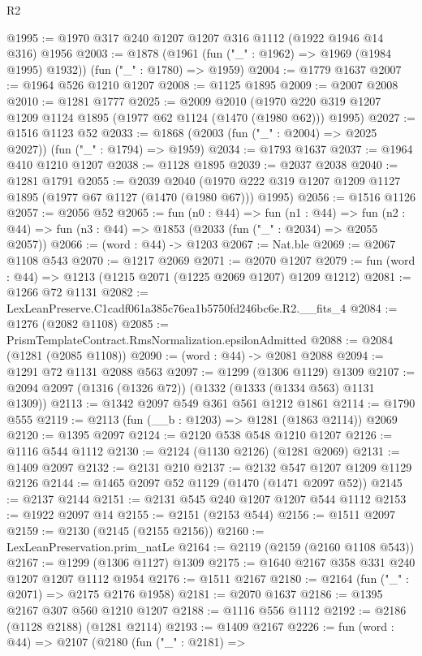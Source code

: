 \begin{lexlean}{R2}
\begin{coremodule}
@1995 := @1970 @317 @240 @1207 @1207 @316 @1112 (@1922 @1946 @14 @316) @1956
@2003 := @1878 (@1961 (fun ("_" : @1962) => @1969 (@1984 @1995) @1932)) (fun ("_" : @1780) => @1959)
@2004 := @1779 @1637
@2007 := @1964 @526 @1210 @1207
@2008 := @1125 @1895
@2009 := @2007 @2008
@2010 := @1281 @1777
@2025 := @2009
    @2010
    (@1970 @220 @319 @1207 @1209 @1124 @1895 (@1977 @62 @1124 (@1470 (@1980 @62))) @1995)
@2027 := @1516 @1123 @52
@2033 := @1868 (@2003 (fun ("_" : @2004) => @2025 @2027)) (fun ("_" : @1794) => @1959)
@2034 := @1793 @1637
@2037 := @1964 @410 @1210 @1207
@2038 := @1128 @1895
@2039 := @2037 @2038
@2040 := @1281 @1791
@2055 := @2039
    @2040
    (@1970 @222 @319 @1207 @1209 @1127 @1895 (@1977 @67 @1127 (@1470 (@1980 @67))) @1995)
@2056 := @1516 @1126
@2057 := @2056 @52
@2065 := fun (n0 : @44) =>
  fun (n1 : @44) =>
  fun (n2 : @44) => fun (n3 : @44) => @1853 (@2033 (fun ("_" : @2034) => @2055 @2057))
@2066 := (word : @44) -> @1203
@2067 := Nat.ble
@2069 := @2067 @1108 @543
@2070 := @1217 @2069
@2071 := @2070 @1207
@2079 := fun (word : @44) => @1213 (@1215 @2071 (@1225 @2069 @1207) @1209 @1212)
@2081 := @1266 @72 @1131
@2082 := LexLeanPreserve.C1cadf061a385c76ea1b5750fd246bc6e.R2.__fits_4
@2084 := @1276 (@2082 @1108)
@2085 := PrismTemplateContract.RmsNormalization.epsilonAdmitted
@2088 := @2084 (@1281 (@2085 @1108))
@2090 := (word : @44) -> @2081 @2088
@2094 := @1291 @72 @1131 @2088 @563
@2097 := @1299 (@1306 @1129) @1309
@2107 := @2094 @2097 (@1316 (@1326 @72)) (@1332 (@1333 (@1334 @563) @1131 @1309))
@2113 := @1342 @2097 @549 @361 @561 @1212 @1861
@2114 := @1790 @555
@2119 := @2113 (fun (__b : @1203) => @1281 (@1863 @2114)) @2069
@2120 := @1395 @2097
@2124 := @2120 @538 @548 @1210 @1207
@2126 := @1116 @544 @1112
@2130 := @2124 (@1130 @2126) (@1281 @2069)
@2131 := @1409 @2097
@2132 := @2131 @210
@2137 := @2132 @547 @1207 @1209 @1129 @2126
@2144 := @1465 @2097 @52 @1129 (@1470 (@1471 @2097 @52))
@2145 := @2137 @2144
@2151 := @2131 @545 @240 @1207 @1207 @544 @1112
@2153 := @1922 @2097 @14
@2155 := @2151 (@2153 @544)
@2156 := @1511 @2097
@2159 := @2130 (@2145 (@2155 @2156))
@2160 := LexLeanPreservation.prim_natLe
@2164 := @2119 (@2159 (@2160 @1108 @543))
@2167 := @1299 (@1306 @1127) @1309
@2175 := @1640 @2167 @358 @331 @240 @1207 @1207 @1112 @1954
@2176 := @1511 @2167
@2180 := @2164 (fun ("_" : @2071) => @2175 @2176 @1958)
@2181 := @2070 @1637
@2186 := @1395 @2167 @307 @560 @1210 @1207
@2188 := @1116 @556 @1112
@2192 := @2186 (@1128 @2188) (@1281 @2114)
@2193 := @1409 @2167
@2226 := fun (word : @44) =>
  @2107
    (@2180
      (fun ("_" : @2181) =>

\end{coremodule}
\end{lexlean}

